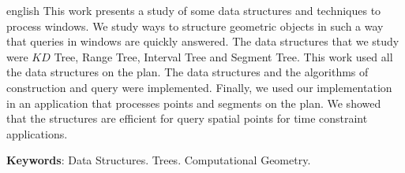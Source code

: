 \begin{resumo}[Abstract]
	\SingleSpacing
	\begin{otherlanguage*}{english}
		This work presents a study of some data structures and techniques to process windows. We study ways to structure geometric objects in such a way that queries in windows are quickly answered. The data structures that we study were $KD$ Tree, Range Tree, Interval Tree and Segment Tree. This work used all the data structures on the plan. The data structures and the algorithms of construction and query were implemented. Finally, we used our implementation in an application that processes points and segments on the plan. We showed that the structures are efficient for query spatial points for time constraint applications. %

		\textbf{Keywords}: Data Structures. Trees. Computational Geometry.
	\end{otherlanguage*}
\end{resumo}



\listoffigures*
\cleardoublepage

\listoftables*
\cleardoublepage



\tableofcontents*
\cleardoublepage

